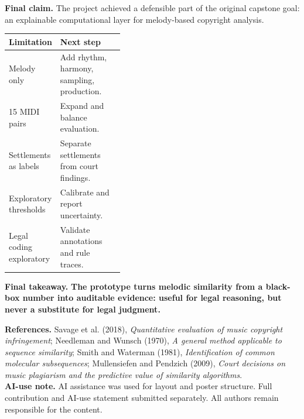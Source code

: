 \documentclass[portrait,a0,final]{a0poster}
\newcommand{\subtitlefont}{\fontsize{26}{31}\selectfont}
\newcommand{\sectionfont}{\fontsize{27}{32}\selectfont}
\newcommand{\bodyfont}{\fontsize{20.5}{25.5}\selectfont}
\newcommand{\tinyfont}{\fontsize{12.8}{16}\selectfont}
\newcommand{\blockhead}[2]{%
  \noindent
  \tikz[baseline=(n.base)]{
    \node[fill=epflred,text=white,rounded corners=1mm,
      inner xsep=3.2mm,inner ysep=1.7mm,
      font=\bfseries\sectionfont] (n) {#1};
    \node[anchor=west,text=epflred,font=\bfseries\sectionfont]
      at ([xshift=4mm]n.east) {#2};
  }\par\vspace{3mm}
}
\begin{document}
\hfill
\begin{minipage}[t]{0.318\textwidth}
\begin{panelbox}[height=178mm]
\blockhead{8}{Conclusion}
\textbf{Final claim.}
The project achieved a defensible part of the original capstone goal: an explainable computational layer for melody-based copyright analysis.

\vspace{3mm}
\begin{tabularx}{\linewidth}{@{}L{0.39\linewidth}Y@{}}
\toprule
\textbf{Limitation} & \textbf{Next step}\\
\midrule
Melody only & Add rhythm, harmony, sampling, production.\\
15 MIDI pairs & Expand and balance evaluation.\\
Settlements as labels & Separate settlements from court findings.\\
Exploratory thresholds & Calibrate and report uncertainty.\\
Legal coding exploratory & Validate annotations and rule traces.\\
\bottomrule
\end{tabularx}
\end{panelbox}
\end{minipage}

\vspace{6mm}

\begin{tcolorbox}[
  enhanced,
  colback=epflred,
  colframe=epflred,
  boxrule=0pt,
  sharp corners,
  left=8mm,
  right=8mm,
  top=5mm,
  bottom=5mm
]
{\subtitlefont\bfseries\color{white} Final takeaway.}
\hspace{3mm}
{\bodyfont\bfseries\color{white} The prototype turns melodic similarity from a black-box number into auditable evidence: useful for legal reasoning, but never a substitute for legal judgment.}
\end{tcolorbox}

\vfill

\begin{tcolorbox}[
  enhanced,
  colback=ink,
  colframe=ink,
  boxrule=0pt,
  sharp corners,
  left=7mm,
  right=7mm,
  top=4mm,
  bottom=4mm
]
{\tinyfont\color{white}
\textbf{References.}
Savage et al. (2018), \textit{Quantitative evaluation of music copyright infringement};
Needleman and Wunsch (1970), \textit{A general method applicable to sequence similarity};
Smith and Waterman (1981), \textit{Identification of common molecular subsequences};
Mullensiefen and Pendzich (2009), \textit{Court decisions on music plagiarism and the predictive value of similarity algorithms}.\\
\textbf{AI-use note.}
AI assistance was used for layout and poster structure. Full contribution and AI-use statement submitted separately. All authors remain responsible for the content.}
\end{tcolorbox}
\end{document}
